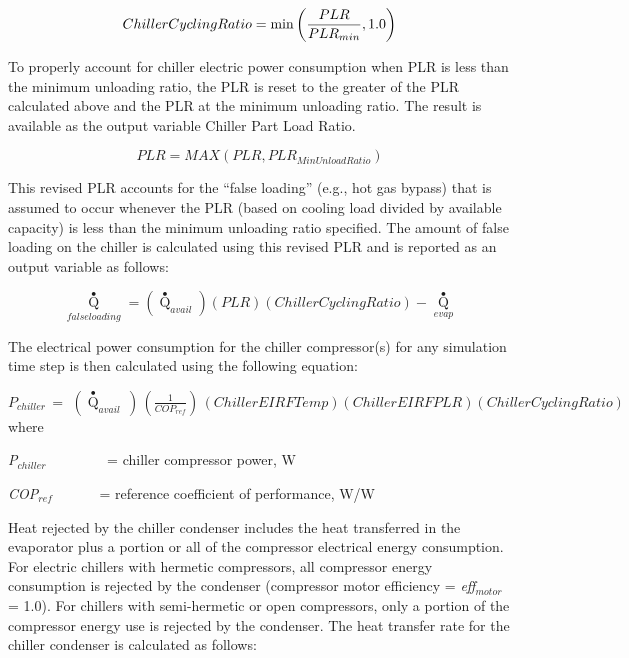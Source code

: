 \begin{equation}
  ChillerCyclingRatio = \min\left(\frac{PLR}{PLR_{min}},1.0\right)
\end{equation}

To properly account for chiller electric power consumption when PLR is less than the minimum unloading ratio, the PLR is reset to the greater of the PLR calculated above and the PLR at the minimum unloading ratio. The result is available as the output variable Chiller Part Load Ratio.

\begin{equation}
PLR = MAX(PLR,PL{R_{MinUnloadRatio}})
\end{equation}

This revised PLR accounts for the ``false loading'' (e.g., hot gas bypass) that is assumed to occur whenever the PLR (based on cooling load divided by available capacity) is less than the minimum unloading ratio specified. The amount of false loading on the chiller is calculated using this revised PLR and is reported as an output variable as follows:

\begin{equation}
{\mathop Q\limits^ \bullet_{falseloading}} = \left( {{{\mathop Q\limits^ \bullet  }_{avail}}} \right)\left( {PLR} \right)\left( {ChillerCyclingRatio} \right) - {\mathop Q\limits^ \bullet_{evap}}
\end{equation}

The electrical power consumption for the chiller compressor(s) for any simulation time step is then calculated using the following equation:

\({P_{chiller}}\, = \,\,\left( {{{\mathop Q\limits^ \bullet }_{avail}}\,} \right)\,\left( {\frac{1}{{CO{P_{ref}}}}} \right)\,\left( {ChillerEIRFTemp} \right)\left( {ChillerEIRFPLR} \right)\left( {ChillerCyclingRatio} \right)\) where

\emph{P\(_{chiller}\)}~~~~~~~~ = chiller compressor power, W

\emph{COP\(_{ref}\)}~~~~~~ = reference coefficient of performance, W/W

Heat rejected by the chiller condenser includes the heat transferred in the evaporator plus a portion or all of the compressor electrical energy consumption. For electric chillers with hermetic compressors, all compressor energy consumption is rejected by the condenser (compressor motor efficiency = \emph{eff\(_{motor}\)} = 1.0). For chillers with semi-hermetic or open compressors, only a portion of the compressor energy use is rejected by the condenser. The heat transfer rate for the chiller condenser is calculated as follows:

